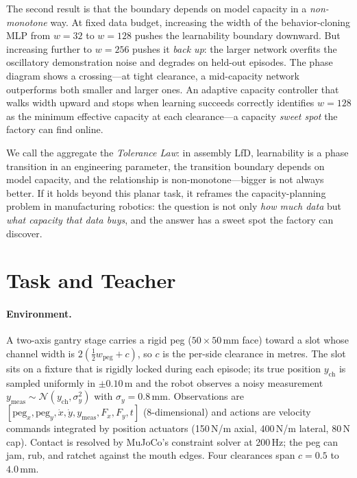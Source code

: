 \documentclass[11pt]{article}
\begin{document}
The second result is that the boundary depends on model capacity in a
\emph{non-monotone} way. At fixed data budget, increasing the width of the
behavior-cloning MLP from $w{=}32$ to $w{=}128$ pushes the learnability
boundary downward. But increasing further to $w{=}256$ pushes it \emph{back
up}: the larger network overfits the oscillatory demonstration noise and
degrades on held-out episodes. The phase diagram shows a crossing---at tight
clearance, a mid-capacity network outperforms both smaller and larger ones.
An adaptive capacity controller that walks width upward and stops when
learning succeeds correctly identifies $w{=}128$ as the minimum effective
capacity at each clearance---a capacity \emph{sweet spot} the factory can
find online.

We call the aggregate the \emph{Tolerance Law}: in assembly LfD, learnability
is a phase transition in an engineering parameter, the transition boundary
depends on model capacity, and the relationship is non-monotone---bigger is
not always better. If it holds beyond this planar task, it reframes the
capacity-planning problem in manufacturing robotics: the question is not only
\emph{how much data} but \emph{what capacity that data buys}, and the
answer has a sweet spot the factory can discover.

\section{Task and Teacher}

\paragraph{Environment.}
A two-axis gantry stage carries a rigid peg ($50{\times}50$\,mm face) toward
a slot whose channel width is $2(\tfrac{1}{2}w_{\text{peg}} + c)$, so $c$
is the per-side clearance in metres. The slot sits on a fixture that is
rigidly locked during each episode; its true position $y_{\mathrm{ch}}$ is
sampled uniformly in $\pm 0.10$\,m and the robot observes a noisy
measurement $y_{\mathrm{meas}} \sim \mathcal{N}(y_{\mathrm{ch}},
\sigma_y^2)$ with $\sigma_y = 0.8$\,mm. Observations are
$[\text{peg}_x, \text{peg}_y, \dot{x}, \dot{y}, y_{\mathrm{meas}}, F_x,
F_y, t]$ (8-dimensional) and actions are velocity commands integrated by
position actuators (150\,N/m axial, 400\,N/m lateral, 80\,N cap). Contact is
resolved by MuJoCo's constraint solver at 200\,Hz; the peg can jam, rub, and
ratchet against the mouth edges. Four clearances span $c = 0.5$ to
$4.0$\,mm.
\end{document}
